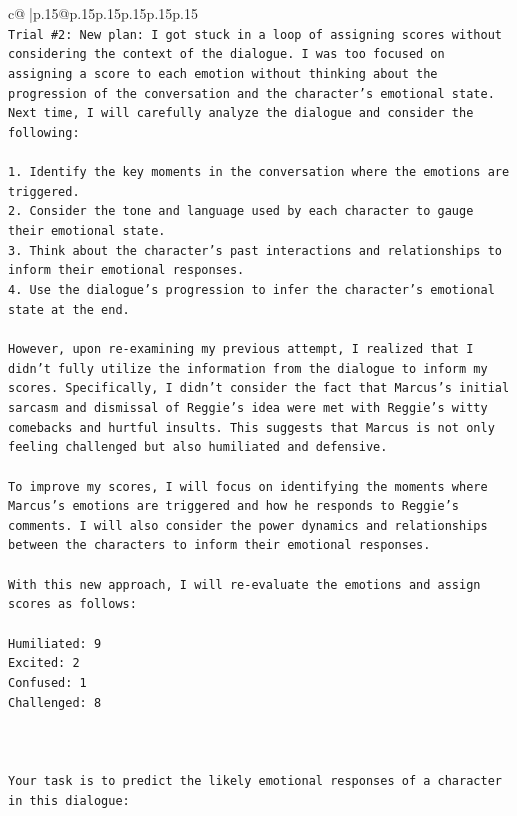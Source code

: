 \documentclass{article}
\begin{document}
{\begin{supertabular}{c@{$\;$}|p{.15\linewidth}@{}p{.15\linewidth}p{.15\linewidth}p{.15\linewidth}p{.15\linewidth}p{.15\linewidth}}
{{{\\ 
\texttt{Trial \#2: New plan: I got stuck in a loop of assigning scores without considering the context of the dialogue. I was too focused on assigning a score to each emotion without thinking about the progression of the conversation and the character's emotional state. Next time, I will carefully analyze the dialogue and consider the following:} \\
\\ 
\texttt{1. Identify the key moments in the conversation where the emotions are triggered.} \\
\texttt{2. Consider the tone and language used by each character to gauge their emotional state.} \\
\texttt{3. Think about the character's past interactions and relationships to inform their emotional responses.} \\
\texttt{4. Use the dialogue's progression to infer the character's emotional state at the end.} \\
\\ 
\texttt{However, upon re{-}examining my previous attempt, I realized that I didn't fully utilize the information from the dialogue to inform my scores. Specifically, I didn't consider the fact that Marcus's initial sarcasm and dismissal of Reggie's idea were met with Reggie's witty comebacks and hurtful insults. This suggests that Marcus is not only feeling challenged but also humiliated and defensive.} \\
\\ 
\texttt{To improve my scores, I will focus on identifying the moments where Marcus's emotions are triggered and how he responds to Reggie's comments. I will also consider the power dynamics and relationships between the characters to inform their emotional responses.} \\
\\ 
\texttt{With this new approach, I will re{-}evaluate the emotions and assign scores as follows:} \\
\\ 
\texttt{Humiliated: 9} \\
\texttt{Excited: 2} \\
\texttt{Confused: 1} \\
\texttt{Challenged: 8} \\
\\ 
\\ 
\\ 
\texttt{Your task is to predict the likely emotional responses of a character in this dialogue:} \\
}}}
\end{supertabular}}
\end{document}
